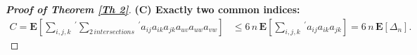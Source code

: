 \documentclass[11pt, reqno]{amsart}
\numberwithin{equation}{section}
\theoremstyle{plain} %
\theoremstyle{definition} %
\begin{document}
\begin{proof}[{\bf Proof of Theorem \ref{Th 2}}]

\textbf{(C) Exactly two common indices:}
\begin{equation}
    \begin{split}
     C=   \mathbf{E}\left[ \sum_{i,j,k}\,^{'}    \sum_{2 \, intersections}\,^{'} a_{ij} a_{ik} a_{jk} a_{uv} a_{uw} a_{vw} \right]  & \leq 6 \, n \,  \mathbf{E}\left[ \sum_{i,j,k}\,^{'}  a_{ij} a_{ik} a_{jk}  \right]  =  6 \, n \,   \mathbf{E}\left[   \Delta_n  \right].
    \end{split}
\end{equation}


\end{proof}
\end{document}
